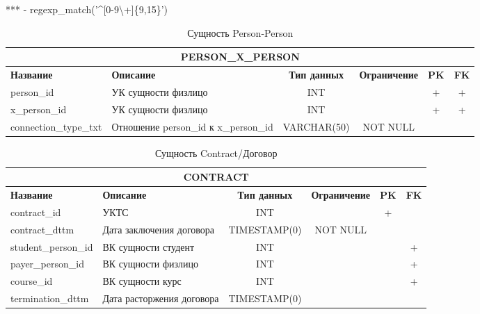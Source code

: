 \documentclass[a4paper]{article}
\begin{document}
*** - regexp\_match('\^{}[0-9\textbackslash{}+]\{9,15\}\textdollar{}')



\newpage



\begin{table}[!hbt]
\begin{tabularx}{\textwidth}{|l|X|c|c|c|c|}
\hline
\multicolumn{6}{|c|}{\textbf{PERSON\_X\_PERSON}}                                                                                                 \\ \hline
\textbf{Название} & \textbf{Описание} & \textbf{Тип данных} & \textbf{Ограничение} & \textbf{PK} & \textbf{FK} \\ \hline
person\_id & УК сущности физлицо & INT & & + & + \\ \hline
x\_person\_id & УК сущности физлицо & INT & & + & + \\ \hline
connection\_type\_txt  & Отношение person\_id к x\_person\_id & VARCHAR(50) & NOT NULL & & \\ \hline
\end{tabularx}
\caption{Сущность Person-Person}
\end{table}

\begin{table}[!hbt]
\begin{tabularx}{\textwidth}{|l|X|c|c|c|c|}
\hline
\multicolumn{6}{|c|}{\textbf{CONTRACT}}                                                                                 \\ \hline
\textbf{Название}   & \textbf{Описание}        & \textbf{Тип данных} & \textbf{Ограничение} & \textbf{PK} & \textbf{FK} \\ \hline
contract\_id        & УКТС     & INT                 &                      & +           &             \\ \hline
contract\_dttm       & Дата заключения договора & TIMESTAMP(0)        & NOT NULL             &             &             \\ \hline
student\_person\_id & ВК сущности студент      & INT                 &                      &             & +           \\ \hline
payer\_person\_id   & ВК сущности физлицо      & INT                 &                      &             & +           \\ \hline
course\_id          & ВК сущности курс         & INT                 &                      &             & +           \\ \hline
termination\_dttm & Дата расторжения договора & TIMESTAMP(0) & & & \\ \hline
\end{tabularx}
\caption{Сущность Contract/Договор}
\end{table}
\end{document}
